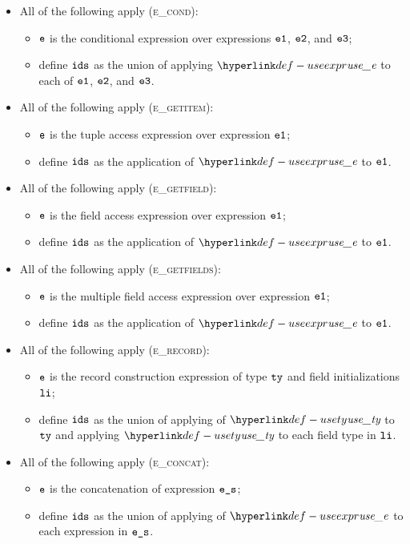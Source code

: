 \begin{itemize}
  \item All of the following apply (\textsc{e\_cond}):
  \begin{itemize}
    \item $\texttt{e}$ is the conditional expression over expressions $\texttt{e1}$, $\texttt{e2}$, and $\texttt{e3}$;
    \item define $\texttt{ids}$ as the union of applying $\useexpr$ to each of $\texttt{e1}$, $\texttt{e2}$, and $\texttt{e3}$.
  \end{itemize}

  \item All of the following apply (\textsc{e\_getitem}):
  \begin{itemize}
    \item $\texttt{e}$ is the tuple access expression over expression $\texttt{e1}$;
    \item define $\texttt{ids}$ as the application of $\useexpr$ to $\texttt{e1}$.
  \end{itemize}

  \item All of the following apply (\textsc{e\_getfield}):
  \begin{itemize}
    \item $\texttt{e}$ is the field access expression over expression $\texttt{e1}$;
    \item define $\texttt{ids}$ as the application of $\useexpr$ to $\texttt{e1}$.
  \end{itemize}

  \item All of the following apply (\textsc{e\_getfields}):
  \begin{itemize}
    \item $\texttt{e}$ is the multiple field access expression over expression $\texttt{e1}$;
    \item define $\texttt{ids}$ as the application of $\useexpr$ to $\texttt{e1}$.
  \end{itemize}

  \item All of the following apply (\textsc{e\_record}):
  \begin{itemize}
    \item $\texttt{e}$ is the record construction expression of type $\texttt{ty}$ and field initializations $\texttt{li}$;
    \item define $\texttt{ids}$ as the union of applying of $\usety$ to $\texttt{ty}$ and applying $\usety$ to each field type in $\texttt{li}$.
  \end{itemize}

  \item All of the following apply (\textsc{e\_concat}):
  \begin{itemize}
    \item $\texttt{e}$ is the concatenation of expression $\texttt{e\_s}$;
    \item define $\texttt{ids}$ as the union of applying of $\useexpr$ to each expression in $\texttt{e\_s}$.
  \end{itemize}


\end{itemize}
